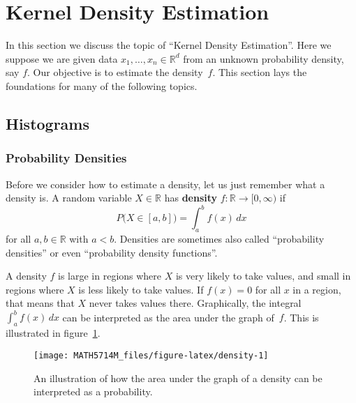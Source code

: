 \documentclass[
  a4paper,
]{article}
\theoremstyle{definition}
\theoremstyle{definition}
\theoremstyle{definition}
\theoremstyle{definition}
\theoremstyle{remark}
\begin{document}
\clearpage

\hypertarget{X01-KDE}{%
\section{Kernel Density Estimation}\label{X01-KDE}}

In this section we discuss the topic of ``Kernel Density Estimation''.
Here we suppose we are given data \(x_1,\ldots, x_n \in\mathbb{R}^d\) from an
unknown probability density, say \(f\). Our objective is to estimate
the density~\(f\). This section lays the foundations for many of the
following topics.

\hypertarget{histograms}{%
\subsection{Histograms}\label{histograms}}

\hypertarget{probability-densities}{%
\subsubsection{Probability Densities}\label{probability-densities}}

Before we consider how to estimate a density, let us just remember what a
density is. A random variable \(X \in \mathbb{R}\) has \textbf{density} \(f\colon \mathbb{R}\to [0, \infty)\) if
\begin{equation*}
  P\bigl(X \in [a,b]\bigr)
  = \int_a^b f(x) \,dx
\end{equation*}
for all \(a, b\in\mathbb{R}\) with \(a < b\). Densities are sometimes also called
``probability densities'' or even ``probability density functions''.

A density \(f\) is large in regions where \(X\) is very likely to take
values, and small in regions where \(X\) is less likely to take values.
If \(f(x) = 0\) for all \(x\) in a region, that means that \(X\) never takes
values there. Graphically, the integral \(\int_a^b f(x) \,dx\) can be
interpreted as the area under the graph of~\(f\). This is illustrated
in figure~\ref{fig:density}.



\begin{figure}

{\centering \texttt{[image: MATH5714M\_files/figure-latex/density-1]} 

}

\caption{An illustration of how the area under the graph of a density can be interpreted as a probability.}\label{fig:density}
\end{figure}
\end{document}
